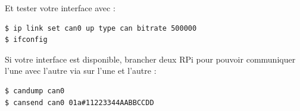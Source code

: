 Et tester votre interface  avec :

\begin{verbatim}
$ ip link set can0 up type can bitrate 500000
$ ifconfig
\end{verbatim}

Si votre interface  est disponible, brancher deux RPi pour
pouvoir communiquer l'une avec l'autre via  sur l'une
et l'autre :
\begin{verbatim}
$ candump can0
$ cansend can0 01a#11223344AABBCCDD
\end{verbatim}








